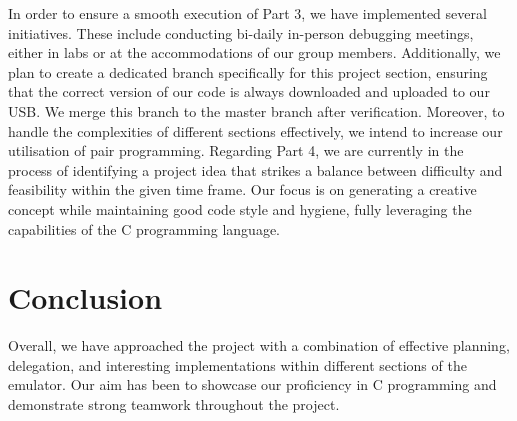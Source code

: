 \documentclass{article}
\begin{document}
In order to ensure a smooth execution of Part 3, we have implemented several
initiatives. These include conducting bi-daily in-person debugging meetings,
either in labs or at the accommodations of our group members. Additionally, we
plan to create a dedicated branch specifically for this project section,
ensuring that the correct version of our code is always downloaded and uploaded
to our USB. We merge this branch to the master branch after verification.
Moreover, to handle the complexities of different sections effectively, we
intend to increase our utilisation of pair programming. Regarding Part 4, we are
currently in the process of identifying a project idea that strikes a balance
between difficulty and feasibility within the given time frame. Our focus is on
generating a creative concept while maintaining good code style and hygiene,
fully leveraging the capabilities of the C programming language.

\section{Conclusion}

Overall, we have approached the project with a combination of effective
planning, delegation, and interesting implementations within different sections
of the emulator. Our aim has been to showcase our proficiency in C programming
and demonstrate strong teamwork throughout the project.
\end{document}
